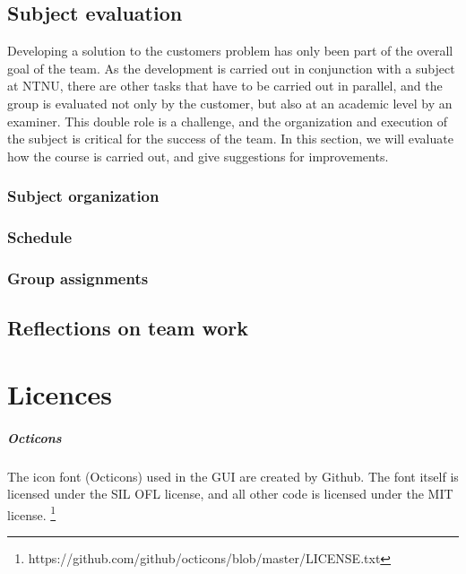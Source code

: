 \documentclass[11pt,a4paper,titlepage,oneside]{report}
\begin{document}
\section{Subject evaluation}
\label{sec:SubjectEvaluation}
Developing a solution to the customers problem has only been part of the overall goal of the team. As the development is carried out in conjunction with a subject at \gls{NTNU}, there are other tasks that have to be carried out in parallel, and the group is evaluated not only by the customer, but also at an academic level by an examiner. This double role is a challenge, and the organization and execution of the subject is critical for the success of the team. In this section, we will evaluate how the course is carried out, and give suggestions for improvements. 

\subsection{Subject organization}

\subsection{Schedule}
\subsection{Group assignments}


\section{Reflections on team work}

\chapter{Licences} %
\paragraph{Octicons}
The icon font (Octicons) used in the GUI are created by Github. The font itself is licensed under the SIL OFL license, and all other code is licensed under the MIT license. \footnote{https://github.com/github/octicons/blob/master/LICENSE.txt}


\begin{flushleft}
	
\end{flushleft}
\end{document}
